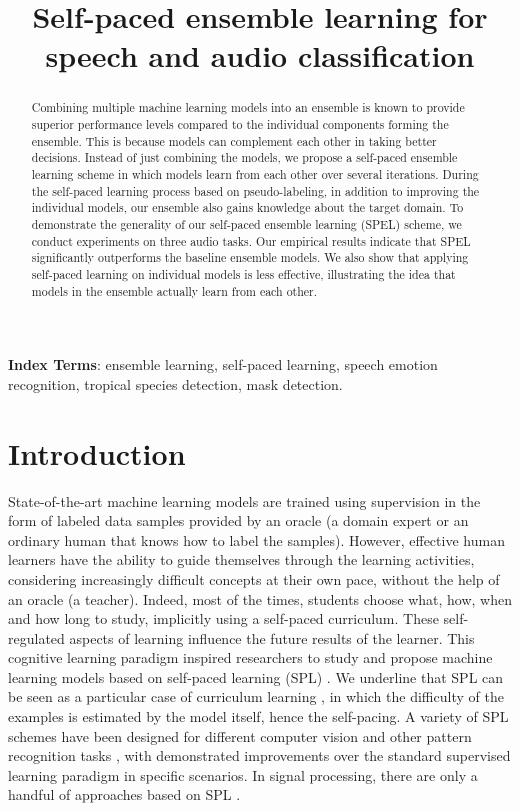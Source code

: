 \documentclass[a4paper]{article}
\title{Self-paced ensemble learning for speech and audio classification}
\begin{document}
\maketitle


\begin{abstract}
Combining multiple machine learning models into an ensemble is known to provide superior performance levels compared to the individual components forming the ensemble. This is because models can complement each other in taking better decisions. Instead of just combining the models, we propose a self-paced ensemble learning scheme in which models learn from each other over several iterations. During the self-paced learning process based on pseudo-labeling, in addition to improving the individual models, our ensemble also gains knowledge about the target domain. To demonstrate the generality of our self-paced ensemble learning (SPEL) scheme, we conduct experiments on three audio tasks. Our empirical results indicate that SPEL significantly outperforms the baseline ensemble models. We also show that applying self-paced learning on individual models is less effective, illustrating the idea that models in the ensemble actually learn from each other.
\end{abstract}
\noindent\textbf{Index Terms}: ensemble learning, self-paced learning, speech emotion recognition, tropical species detection, mask detection.

\setlength{\abovedisplayskip}{3pt}
\setlength{\belowdisplayskip}{3pt}

\vspace{-0.1cm}
\section{Introduction}

State-of-the-art machine learning models are trained using supervision in the form of labeled data samples provided by an oracle (a domain expert or an ordinary human that knows how to label the samples). However, effective human learners have the ability to guide themselves through the learning activities, considering increasingly difficult concepts at their own pace, without the help of an oracle (a teacher). Indeed, most of the times, students choose what, how, when and how long to study, implicitly using a self-paced curriculum. These self-regulated aspects of learning influence the future results of the learner. This cognitive learning paradigm inspired researchers to study and propose machine learning models based on self-paced learning (SPL) \cite{kumar2010self, jiang2015self}. We underline that SPL can be seen as a particular case of curriculum learning \cite{Bengio-ICML-2009,Soviany-A-2021}, in which the difficulty of the examples is estimated by the model itself, hence the self-pacing. A variety of SPL schemes have been designed for different computer vision \cite{jiang2015self, lin2020pixel} and other pattern recognition tasks \cite{zheng2020unsupervised, zhou2020self}, with demonstrated improvements over the standard supervised learning paradigm in specific scenarios. In signal processing, there are only a handful of approaches based on SPL \cite{shang2018self}. 
\end{document}
